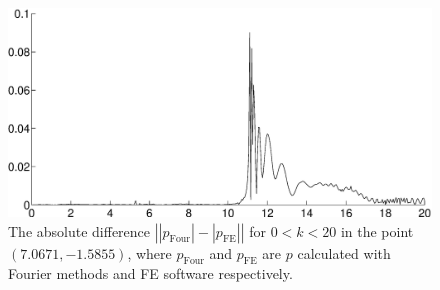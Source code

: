\documentclass[numreferences]{kluwer}
\providecommand{\abs}[1]{\left\lvert#1\right\rvert}
\renewcommand{\Phi}{\varPhi}
\renewcommand{\Re}{\operatorname{Re}}
\renewcommand{\Phi}{\varPhi}
\begin{document}
\begin{figure}[htb]
  \centering
  \includegraphics[width=\linewidth]{totalfaltFEM-Fourier}
  \caption{The absolute difference
    $\abs{\abs{p_{\text{Four}}}-\abs{p_{\text{FE}}}}$ for $0<k<20$ in the
    point $(7.0671,-1.5855)$, where $p_{\text{Four}}$ and
    $p_{\text{FE}}$ are $p$ calculated with Fourier methods and FE
    software respectively.}
  \label{fig:totalfaltFEMFour}
\end{figure}





\end{document}

